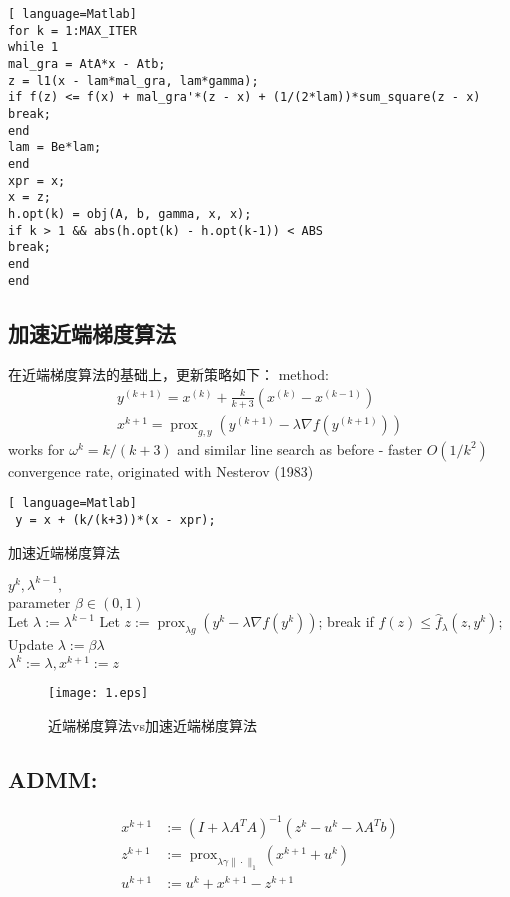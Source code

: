 \documentclass[cn,11pt,chinese,black]{elegantbook}
\begin{document}
\begin{lstlisting}[ language=Matlab] 
for k = 1:MAX_ITER
while 1
mal_gra = AtA*x - Atb;
z = l1(x - lam*mal_gra, lam*gamma);
if f(z) <= f(x) + mal_gra'*(z - x) + (1/(2*lam))*sum_square(z - x)
break;
end
lam = Be*lam;
end
xpr = x;
x = z;
h.opt(k) = obj(A, b, gamma, x, x);
if k > 1 && abs(h.opt(k) - h.opt(k-1)) < ABS
break;
end
end
\end{lstlisting}
\subsection{加速近端梯度算法}
在近端梯度算法的基础上，更新策略如下：
method:
$$\begin{array}{c}
y^{(k+1)}=x^{(k)}+\frac{k}{k+3}\left(x^{(k)}-x^{(k-1)}\right) \\
x^{k+1}=\operatorname{prox}_{g, y}\left(y^{(k+1)}-\lambda \nabla f\left(y^{(k+1)}\right)\right)
\end{array}$$
works for $\omega^{k}=k /(k+3)$ and similar line search as before
- faster $O\left(1 / k^{2}\right)$ convergence rate, originated with Nesterov (1983)
\begin{lstlisting}[ language=Matlab] 
 y = x + (k/(k+3))*(x - xpr);
 \end{lstlisting}
\begin{algorithm}[h]
	\caption{加速近端梯度算法}
	\label{alg::conjugateGradient}
	\begin{algorithmic}[1]
		\Require
		$y^{k}, \lambda^{k-1},$\\
		parameter $\beta \in(0,1)$ \\
		Let $\lambda:=\lambda^{k-1}$
		\Repeat
		\State  Let $z:=\operatorname{prox}_{\lambda g}\left(y^{k}-\lambda \nabla f\left(y^{k}\right)\right)$;
		\State  break if $f(z) \leq \hat{f}_{\lambda}\left(z, y^{k}\right)$;
		\State Update $\lambda:=\beta \lambda$ \\
		\Return  $\lambda^{k}:=\lambda, x^{k+1}:=z$			
	   \end{algorithmic}
\end{algorithm} 

 \begin{figure}[htb]
 	\centering
 	\texttt{[image: 1.eps]}
 	\caption{近端梯度算法vs加速近端梯度算法}
 \end{figure}
\subsection{ADMM:}
$$\begin{aligned}
x^{k+1} &:=\left(I+\lambda A^{T} A\right)^{-1}\left(z^{k}-u^{k}-\lambda A^{T} b\right) \\
z^{k+1} &:=\operatorname{prox}_{\lambda \gamma\|\cdot\|_{1}}\left(x^{k+1}+u^{k}\right) \\
u^{k+1} &:=u^{k}+x^{k+1}-z^{k+1}
\end{aligned}$$
\end{document}
